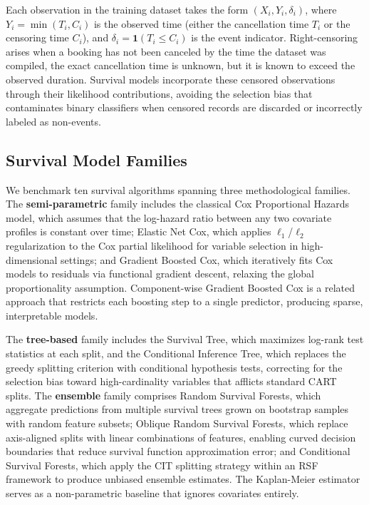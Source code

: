\documentclass[pdflatex,iicol,sn-mathphys-ay]{sn-jnl}
\theoremstyle{thmstyleone}%
\theoremstyle{thmstyletwo}%
\theoremstyle{thmstylethree}%
\begin{document}
Each observation in the training dataset takes the form $(X_i, Y_i, \delta_i)$, where $Y_i = \min(T_i, C_i)$ is the observed time (either the cancellation time $T_i$ or the censoring time $C_i$), and $\delta_i = \mathbf{1}(T_i \leq C_i)$ is the event indicator. Right-censoring arises when a booking has not been canceled by the time the dataset was compiled, the exact cancellation time is unknown, but it is known to exceed the observed duration. Survival models incorporate these censored observations through their likelihood contributions, avoiding the selection bias that contaminates binary classifiers when censored records are discarded or incorrectly labeled as non-events.

\subsection{Survival Model Families}

We benchmark ten survival algorithms spanning three methodological families. The \textbf{semi-parametric} family includes the classical Cox Proportional Hazards model, which assumes that the log-hazard ratio between any two covariate profiles is constant over time; Elastic Net Cox, which applies $\ell_1$/$\ell_2$ regularization to the Cox partial likelihood for variable selection in high-dimensional settings; and Gradient Boosted Cox, which iteratively fits Cox models to residuals via functional gradient descent, relaxing the global proportionality assumption. Component-wise Gradient Boosted Cox is a related approach that restricts each boosting step to a single predictor, producing sparse, interpretable models.

The \textbf{tree-based} family includes the Survival Tree, which maximizes log-rank test statistics at each split, and the Conditional Inference Tree, which replaces the greedy splitting criterion with conditional hypothesis tests, correcting for the selection bias toward high-cardinality variables that afflicts standard CART splits. The \textbf{ensemble} family comprises Random Survival Forests, which aggregate predictions from multiple survival trees grown on bootstrap samples with random feature subsets; Oblique Random Survival Forests, which replace axis-aligned splits with linear combinations of features, enabling curved decision boundaries that reduce survival function approximation error; and Conditional Survival Forests, which apply the CIT splitting strategy within an RSF framework to produce unbiased ensemble estimates. The Kaplan-Meier estimator serves as a non-parametric baseline that ignores covariates entirely.
\end{document}
